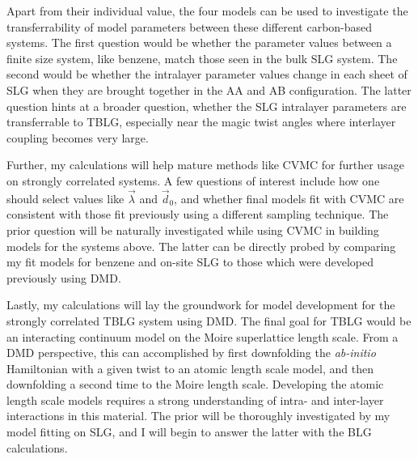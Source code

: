 \documentclass[12pt]{article}
\begin{document}
Apart from their individual value, the four models can be used to investigate the transferrability of model parameters between these different carbon-based systems.
The first question would be whether the parameter values between a finite size system, like benzene, match those seen in the bulk SLG system.
The second would be whether the intralayer parameter values change in each sheet of SLG when they are brought together in the AA and AB configuration.
The latter question hints at a broader question, whether the SLG intralayer parameters are transferrable to TBLG, especially near the magic twist angles where interlayer coupling becomes very large.

Further, my calculations will help mature methods like CVMC for further usage on strongly correlated systems.
A few questions of interest include how one should select values like $\vec{\lambda}$ and $\vec{d}_0$, and whether final models fit with CVMC are consistent with those fit previously using a different sampling technique.
The prior question will be naturally investigated while using CVMC in building models for the systems above.
The latter can be directly probed by comparing my fit models for benzene and on-site SLG to those which were developed previously using DMD.

Lastly, my calculations will lay the groundwork for model development for the strongly correlated TBLG system using DMD.
The final goal for TBLG would be an interacting continuum model on the Moire superlattice length scale.
From a DMD perspective, this can accomplished by first downfolding the \textit{ab-initio} Hamiltonian with a given twist to an atomic length scale model, and then downfolding a second time to the Moire length scale.
Developing the atomic length scale models requires a strong understanding of intra- and inter-layer interactions in this material.
The prior will be thoroughly investigated by my model fitting on SLG, and I will begin to answer the latter with the BLG calculations.
\end{document}
